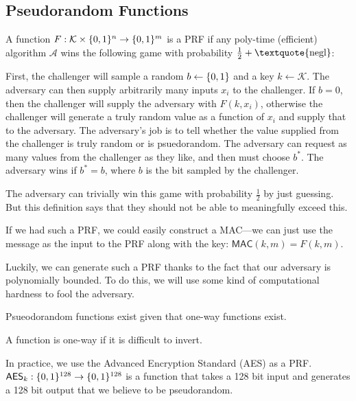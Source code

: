 \subsection{Pseudorandom Functions}
\begin{definition}
	A function $F: \mathcal{K} \times \{0,1\}^n \rightarrow \{0,1\}^m$ is a PRF if any poly-time (efficient) algorithm $\mathcal{A}$ wins the following game with probability $\tfrac{1}{2} + \text{\textquote{negl}}$: 

	First, the challenger will sample a random $b \leftarrow \{0,1\}$ and a key $k \leftarrow \mathcal{K}$. The adversary can then supply arbitrarily many inputs $x_i$ to the challenger. If $b=0$, then the challenger will supply the adversary with $F(k, x_i)$, otherwise the challenger will generate a truly random value as a function of $x_i$ and supply that to the adversary. The adversary's job is to tell whether the value supplied from the challenger is truly random or is psuedorandom. The adversary can request as many values from the challenger as they like, and then must choose $b^*$. The adversary wins if $b^* = b$, where $b$ is the bit sampled by the challenger.

	The adversary can trivially win this game with probability $\tfrac{1}{2}$ by just guessing. But this definition says that they should not be able to meaningfully exceed this.
\end{definition}

If we had such a PRF, we could easily construct a MAC---we can just use the message as the input to the PRF along with the key: $\mathsf{MAC}(k, m) = F(k, m)$.

Luckily, we can generate such a PRF thanks to the fact that our adversary is polynomially bounded. To do this, we will use some kind of computational hardness to fool the adversary.

\begin{theorem}
	Psueodorandom functions exist given that one-way functions exist.
\end{theorem}

\begin{definition}
	A function is one-way if it is difficult to invert. %
\end{definition}

In practice, we use the Advanced Encryption Standard (AES) as a PRF. $\mathsf{AES}_k: \{0,1\}^{128} \rightarrow \{0,1\}^{128}$ is a function that takes a 128 bit input and generates a 128 bit output that we believe to be pseudorandom.  

